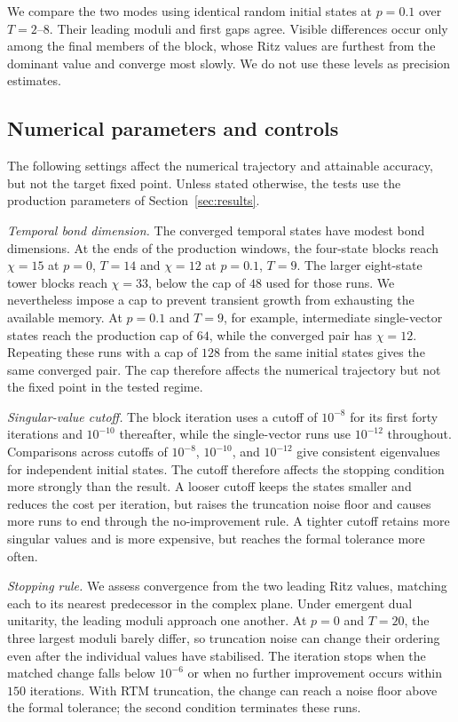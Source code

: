 We compare the two modes using identical random initial states at $p=0.1$ over $T=2$--$8$. Their leading moduli and first gaps agree. Visible differences occur only among the final members of the block, whose Ritz values are furthest from the dominant value and converge most slowly. We do not use these levels as precision estimates.

\subsection{Numerical parameters and controls}
\label{app:library:build}
\label{app:library:cluster}
\label{app:library:adaptive}
\label{app:selector}

The following settings affect the numerical trajectory and attainable accuracy, but not the target fixed point. Unless stated otherwise, the tests use the production parameters of Section~\ref{sec:results}.

\textit{Temporal bond dimension.} The converged temporal states have modest bond dimensions. At the ends of the production windows, the four-state blocks reach $\chi=15$ at $p=0$, $T=14$ and $\chi=12$ at $p=0.1$, $T=9$. The larger eight-state tower blocks reach $\chi=33$, below the cap of $48$ used for those runs. We nevertheless impose a cap to prevent transient growth from exhausting the available memory. At $p=0.1$ and $T=9$, for example, intermediate single-vector states reach the production cap of $64$, while the converged pair has $\chi=12$. Repeating these runs with a cap of $128$ from the same initial states gives the same converged pair. The cap therefore affects the numerical trajectory but not the fixed point in the tested regime.

\textit{Singular-value cutoff.} The block iteration uses a cutoff of $10^{-8}$ for its first forty iterations and $10^{-10}$ thereafter, while the single-vector runs use $10^{-12}$ throughout. Comparisons across cutoffs of $10^{-8}$, $10^{-10}$, and $10^{-12}$ give consistent eigenvalues for independent initial states. The cutoff therefore affects the stopping condition more strongly than the result. A looser cutoff keeps the states smaller and reduces the cost per iteration, but raises the truncation noise floor and causes more runs to end through the no-improvement rule. A tighter cutoff retains more singular values and is more expensive, but reaches the formal tolerance more often.

\textit{Stopping rule.} We assess convergence from the two leading Ritz values, matching each to its nearest predecessor in the complex plane. Under emergent dual unitarity, the leading moduli approach one another. At $p=0$ and $T=20$, the three largest moduli barely differ, so truncation noise can change their ordering even after the individual values have stabilised. The iteration stops when the matched change falls below $10^{-6}$ or when no further improvement occurs within $150$ iterations. With \ac{RTM} truncation, the change can reach a noise floor above the formal tolerance; the second condition terminates these runs.

